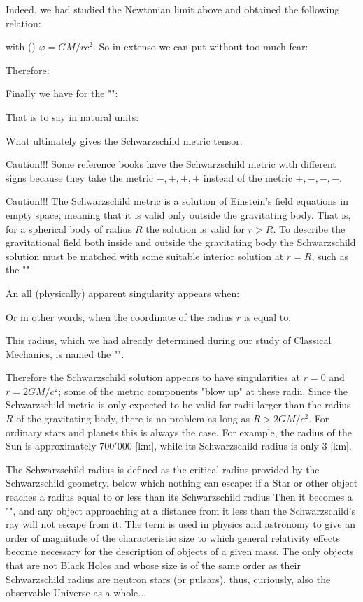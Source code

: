	Indeed, we had studied the Newtonian limit above and obtained the following relation:
	
	with () $\varphi=GM/rc^2$. So in extenso we can put without too much fear:
	
	Therefore:
	
	Finally we have for the "":
	
	That is to say in natural units:
	
	What ultimately gives the Schwarzschild metric tensor:
	
	Caution!!! Some reference books have the Schwarzschild metric with different signs because they take the metric $-, +, +, +$ instead of the metric $+, -, -, -$.
	
	Caution!!! The Schwarzschild metric is a solution of Einstein's field equations in \underline{empty space}, meaning that it is valid only outside the gravitating body. That is, for a spherical body of radius $R$ the solution is valid for $r > R$. To describe the gravitational field both inside and outside the gravitating body the Schwarzschild solution must be matched with some suitable interior solution at $r = R$, such as the "".

	An all (physically) apparent singularity appears when:
	
	Or in other words, when the coordinate of the radius $r$ is equal to:
	
	This radius, which we had already determined during our study of Classical Mechanics, is named the "".

	Therefore the Schwarzschild solution appears to have singularities at $r = 0$ and $r = 2GM/c^2$; some of the metric components "blow up" at these radii. Since the Schwarzschild metric is only expected to be valid for radii larger than the radius $R$ of the gravitating body, there is no problem as long as $R > 2GM/c^2$. For ordinary stars and planets this is always the case. For example, the radius of the Sun is approximately $700'000$ [km], while its Schwarzschild radius is only $3$ [km].
	
	The Schwarzschild radius is defined as the critical radius provided by the Schwarzschild geometry, below which nothing can escape: if a Star or other object reaches a radius equal to or less than its Schwarzschild radius Then it becomes a "", and any object approaching at a distance from it less than the Schwarzschild's ray will not escape from it. The term is used in physics and astronomy to give an order of magnitude of the characteristic size to which general relativity effects become necessary for the description of objects of a given mass. The only objects that are not Black Holes and whose size is of the same order as their Schwarzschild radius are neutron stars (or pulsars), thus, curiously, also the observable Universe as a whole...
	
